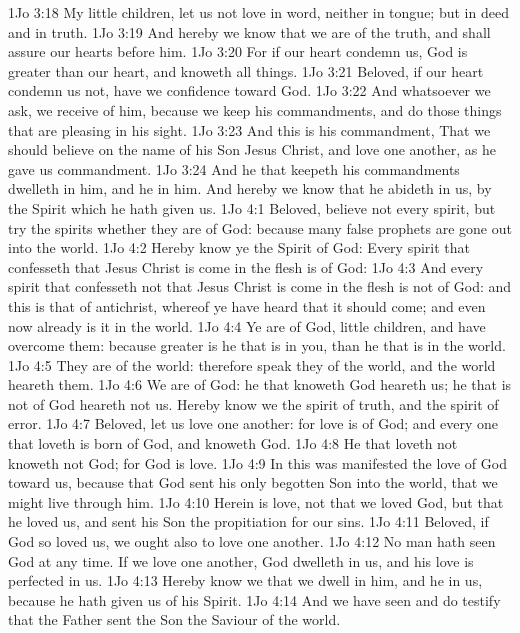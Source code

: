\vs 1Jo 3:18 My little children, let us not love in word, neither in tongue; but in deed and in truth.
\vs 1Jo 3:19 And hereby we know that we are of the truth, and shall assure our hearts before him.
\vs 1Jo 3:20 For if our heart condemn us, God is greater than our heart, and knoweth all things.
\vs 1Jo 3:21 Beloved, if our heart condemn us not,  have we confidence toward God.
\vs 1Jo 3:22 And whatsoever we ask, we receive of him, because we keep his commandments, and do those things that are pleasing in his sight.
\vs 1Jo 3:23 And this is his commandment, That we should believe on the name of his Son Jesus Christ, and love one another, as he gave us commandment.
\vs 1Jo 3:24 And he that keepeth his commandments dwelleth in him, and he in him. And hereby we know that he abideth in us, by the Spirit which he hath given us.
\vs 1Jo 4:1 Beloved, believe not every spirit, but try the spirits whether they are of God: because many false prophets are gone out into the world.
\vs 1Jo 4:2 Hereby know ye the Spirit of God: Every spirit that confesseth that Jesus Christ is come in the flesh is of God:
\vs 1Jo 4:3 And every spirit that confesseth not that Jesus Christ is come in the flesh is not of God: and this is that  of antichrist, whereof ye have heard that it should come; and even now already is it in the world.
\vs 1Jo 4:4 Ye are of God, little children, and have overcome them: because greater is he that is in you, than he that is in the world.
\vs 1Jo 4:5 They are of the world: therefore speak they of the world, and the world heareth them.
\vs 1Jo 4:6 We are of God: he that knoweth God heareth us; he that is not of God heareth not us. Hereby know we the spirit of truth, and the spirit of error.
\vs 1Jo 4:7 Beloved, let us love one another: for love is of God; and every one that loveth is born of God, and knoweth God.
\vs 1Jo 4:8 He that loveth not knoweth not God; for God is love.
\vs 1Jo 4:9 In this was manifested the love of God toward us, because that God sent his only begotten Son into the world, that we might live through him.
\vs 1Jo 4:10 Herein is love, not that we loved God, but that he loved us, and sent his Son  the propitiation for our sins.
\vs 1Jo 4:11 Beloved, if God so loved us, we ought also to love one another.
\vs 1Jo 4:12 No man hath seen God at any time. If we love one another, God dwelleth in us, and his love is perfected in us.
\vs 1Jo 4:13 Hereby know we that we dwell in him, and he in us, because he hath given us of his Spirit.
\vs 1Jo 4:14 And we have seen and do testify that the Father sent the Son  the Saviour of the world.
